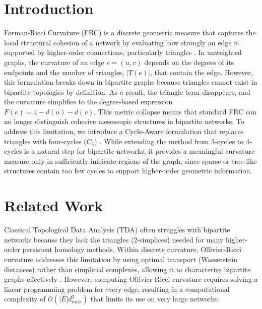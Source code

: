 \documentclass{siuro250211}
\theoremstyle{remark}
\theoremstyle{plain}
\begin{document}
\section{Introduction}
Forman-Ricci Curvature (FRC) \cite{forman2003bochner} is a discrete geometric measure that captures the local structural cohesion of a network by evaluating how strongly an edge is supported by higher-order connections, particularly triangles \cite{sreejith2016forman}. In unweighted graphs, the curvature of an edge $e=(u,v)$ depends on the degrees of its endpoints and the number of triangles, $|T(e)|$, that contain the edge. However, this formulation breaks down in bipartite graphs because triangles cannot exist in bipartite topologies by definition. As a result, the triangle term disappears, and the curvature simplifies to the degree-based expression $F(e) = 4 - d(u) - d(v)$. This metric collapse means that standard FRC can no longer distinguish cohesive mesoscopic structures in bipartite networks. To address this limitation, we introduce a Cycle-Aware formulation that replaces triangles with four-cycles ($C_4$) \cite{opsahl2013triadic, latapy2008basic}. While extending the method from 3-cycles to 4-cycles is a natural step for bipartite networks, it provides a meaningful curvature measure only in sufficiently intricate regions of the graph, since sparse or tree-like structures contain too few cycles to support higher-order geometric information.

\section{Related Work}
Classical Topological Data Analysis (TDA) often struggles with bipartite networks because they lack the triangles (2-simplices) needed for many higher-order persistent homology methods. Within discrete curvature, Ollivier-Ricci curvature \cite{ollivier2009ricci} addresses this limitation by using optimal transport (Wasserstein distances) rather than simplicial complexes, allowing it to characterize bipartite graphs effectively \cite{ni2015ricci, samal2018comparative}. However, computing Ollivier-Ricci curvature requires solving a linear programming problem for every edge, resulting in a computational complexity of $\mathcal{O}(|E|d_{max}^3)$ that limits its use on very large networks.
\end{document}
